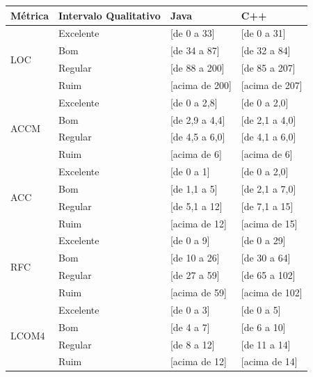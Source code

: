 	\begin{table}[!ht]
	\begin{center}
	\begin{tabular}{ |l|l|l|l| }
		\hline
		Métrica & Intervalo Qualitativo & Java & C++ \\ \hline
		\multirow{4}{*}{LOC} 
		 & Excelente & [de 0 a 33] & [de 0 a 31] \\
		 & Bom & [de 34 a 87] & [de 32 a 84] \\
		 & Regular & [de 88 a 200] & [de 85 a 207] \\
		 & Ruim & [acima de 200] & [acima de 207] \\ \hline
		 
		\multirow{4}{*}{ACCM} 
		 & Excelente & [de 0 a 2,8] & [de 0 a 2,0] \\
		 & Bom & [de 2,9 a 4,4] & [de 2,1 a 4,0] \\
		 & Regular & [de 4,5 a 6,0] & [de 4,1 a 6,0] \\
		 & Ruim & [acima de 6] & [acima de 6] \\ \hline
		 
		 
		\multirow{4}{*}{ACC} 
		 & Excelente & [de 0 a 1] & [de 0 a 2,0] \\
		 & Bom & [de 1,1 a 5] & [de 2,1 a 7,0] \\
		 & Regular & [de 5,1 a 12] & [de 7,1 a 15] \\
		 & Ruim & [acima de 12] & [acima de 15] \\ \hline
	
		 
		\multirow{4}{*}{RFC} 
		 & Excelente & [de 0 a 9] & [de 0 a 29] \\
		 & Bom & [de 10 a 26] & [de 30 a 64] \\
		 & Regular & [de 27 a 59] & [de 65 a 102] \\
		 & Ruim & [acima de 59] & [acima de 102] \\ \hline
		 
		\multirow{4}{*}{LCOM4} 
		 & Excelente & [de 0 a 3] & [de 0 a 5] \\
		 & Bom & [de 4 a 7] & [de 6 a 10] \\
		 & Regular & [de 8 a 12] & [de 11 a 14] \\
		 & Ruim & [acima de 12] & [acima de 14] \\ \hline
		 

\end{tabular}
\end{center}
\end{table}
